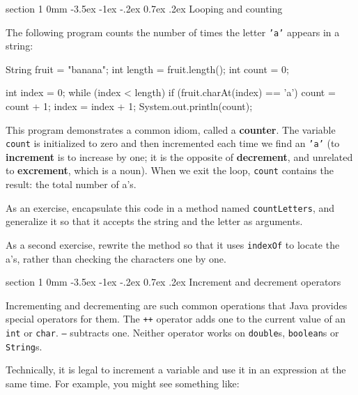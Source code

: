 \documentclass{book}
\makeatletter
\renewcommand{\section}{\@startsection 
    {section} {1} {0mm}%
    {-3.5ex \@plus -1ex \@minus -.2ex}%
    {0.7ex \@plus.2ex}%
    {\normalfont\Large\bfseries}}
\makeatother
\begin{document}
\section{Looping and counting}
\label{loopcount}

The following program counts the
number of times the letter {\tt 'a'} appears in a string:

\begin{verbatimtab}
    String fruit = "banana";
    int length = fruit.length();
    int count = 0;

    int index = 0;
    while (index < length) {
      if (fruit.charAt(index) == 'a') {
        count = count + 1;
      }
      index = index + 1;
    }
    System.out.println(count);
\end{verbatimtab}
%
This program demonstrates a common idiom, called a {\bf counter}.  The
variable {\tt count} is initialized to zero and then incremented each
time we find an {\tt 'a'} (to {\bf increment} is to increase by one;
it is the opposite of {\bf decrement}, and unrelated to {\bf
excrement}, which is a noun).  When we exit the loop, {\tt count}
contains the result: the total number of a's.


As an exercise, encapsulate this code in a method named
{\tt countLetters}, and generalize it so that it accepts the
string and the letter as arguments.


As a second exercise, rewrite the method so that it uses
{\tt indexOf} to locate the a's, rather than checking
the characters one by one.


\section{Increment and decrement operators}

Incrementing and decrementing are such common operations that
Java provides special operators for them.  The {\tt ++}
operator adds one to the current value of an {\tt int} or
{\tt char}.  {\tt --} subtracts one.  Neither operator works
on {\tt double}s, {\tt boolean}s or {\tt String}s.

Technically, it is legal to increment a variable and use it
in an expression at the same time.  For example, you might see
something like:
\end{document}
